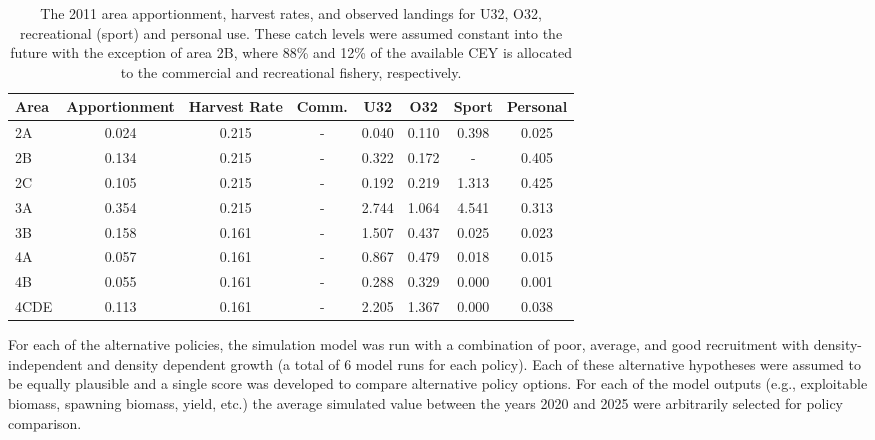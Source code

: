 \begin{table}
	\caption{The 2011 area apportionment, harvest rates, and observed landings for U32, O32, recreational (sport) and personal use.  These catch levels were assumed constant into the future with the exception of area 2B, where 88\% and 12\% of the available CEY is allocated to the commercial and recreational fishery, respectively.}
	\label{table:2011otherLandings}
	\begin{center}
\begin{tabular}{l|cc | ccccc}
\hline
Area &  Apportionment & Harvest Rate &    Comm. & U32&  O32 & Sport & Personal\\
\hline
2A   & 0.024 & 0.215 &   - &   0.040 & 0.110 & 0.398 & 0.025\\
2B   & 0.134 & 0.215 &   - &   0.322 & 0.172 & -     & 0.405\\
2C   & 0.105 & 0.215 &   - &   0.192 & 0.219 & 1.313 & 0.425\\
3A   & 0.354 & 0.215 &   - &   2.744 & 1.064 & 4.541 & 0.313\\
3B   & 0.158 & 0.161 &   - &   1.507 & 0.437 & 0.025 & 0.023\\
4A   & 0.057 & 0.161 &   - &   0.867 & 0.479 & 0.018 & 0.015\\
4B   & 0.055 & 0.161 &   - &   0.288 & 0.329 & 0.000 & 0.001\\
4CDE & 0.113 & 0.161 &   - &   2.205 & 1.367 & 0.000 & 0.038\\
\hline
\end{tabular}

	\end{center}
\end{table}

For each of the alternative policies, the simulation model was run with a combination of poor, average, and good recruitment with density-independent and density dependent growth (a total of 6 model runs for each policy).  Each of these alternative hypotheses were assumed to be equally plausible and a single score was developed to compare alternative policy options.  For each of the model outputs (e.g., exploitable biomass, spawning biomass, yield, etc.)  the average simulated value between the years 2020 and 2025 were arbitrarily selected for policy comparison.



































